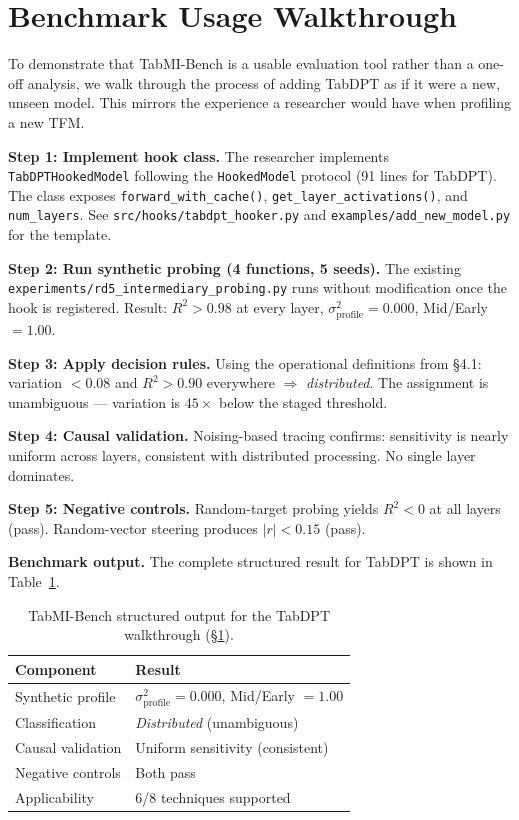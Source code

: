 \documentclass{article}
\begin{document}
\section{Benchmark Usage Walkthrough}
\label{app:walkthrough}

To demonstrate that TabMI-Bench is a usable evaluation tool rather than a one-off analysis, we walk through the process of adding TabDPT as if it were a new, unseen model. This mirrors the experience a researcher would have when profiling a new TFM.

\textbf{Step 1: Implement hook class.} The researcher implements \texttt{TabDPTHookedModel} following the \texttt{HookedModel} protocol (91 lines for TabDPT). The class exposes \texttt{forward\_with\_cache()}, \texttt{get\_layer\_activations()}, and \texttt{num\_layers}. See \texttt{src/hooks/tabdpt\_hooker.py} and \texttt{examples/add\_new\_model.py} for the template.

\textbf{Step 2: Run synthetic probing (4 functions, 5 seeds).} The existing \texttt{experiments/rd5\_intermediary\_probing.py} runs without modification once the hook is registered. Result: $R^2 > 0.98$ at every layer, $\sigma^2_\text{profile} = 0.000$, Mid/Early $= 1.00$.

\textbf{Step 3: Apply decision rules.} Using the operational definitions from \S4.1: variation $< 0.08$ and $R^2 > 0.90$ everywhere $\Rightarrow$ \textit{distributed}. The assignment is unambiguous --- variation is $45\times$ below the staged threshold.

\textbf{Step 4: Causal validation.} Noising-based tracing confirms: sensitivity is nearly uniform across layers, consistent with distributed processing. No single layer dominates.

\textbf{Step 5: Negative controls.} Random-target probing yields $R^2 < 0$ at all layers (pass). Random-vector steering produces $|r| < 0.15$ (pass).

\textbf{Benchmark output.} The complete structured result for TabDPT is shown in Table~\ref{tab:walkthrough-output}.

\begin{table}[htbp]
\centering
\caption{TabMI-Bench structured output for the TabDPT walkthrough (\S\ref{app:walkthrough}).}
\label{tab:walkthrough-output}
\small
\begin{tabular}{@{}l l@{}}
\toprule
Component & Result \\
\midrule
Synthetic profile & $\sigma^2_\text{profile} = 0.000$, Mid/Early $= 1.00$ \\
Classification & \textit{Distributed} (unambiguous) \\
Causal validation & Uniform sensitivity (consistent) \\
Negative controls & Both pass \\
Applicability & 6/8 techniques supported \\
\bottomrule
\end{tabular}
\end{table}
\end{document}
